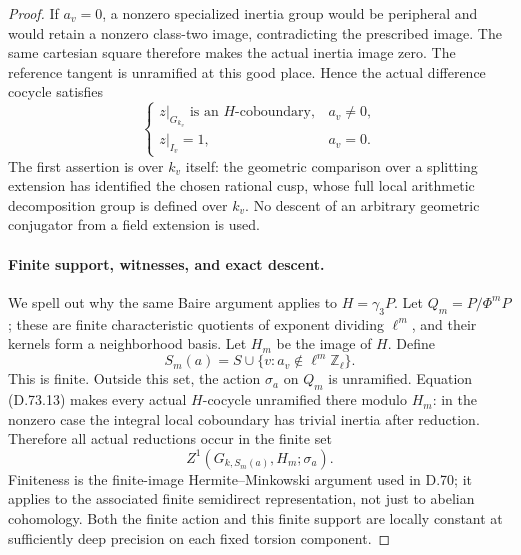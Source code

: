 \begin{proof}
If \(a_v=0\), a nonzero specialized
inertia group would be peripheral
and would retain a nonzero
class-two image, contradicting
the prescribed image. The same
cartesian square therefore makes
the actual inertia image zero.
The reference tangent is unramified
at this good place. Hence the
actual difference cocycle satisfies
\[
 \begin{cases}
 z|_{G_{k_v}}\text{ is an }H\text{-coboundary},
                                             &a_v\ne0,\\
 z|_{I_v}=1,                                &a_v=0.
 \end{cases}                                             \tag{D.73.13}
\]
The first assertion is over \(k_v\)
itself: the geometric comparison
over a splitting extension has
identified the chosen rational
cusp, whose full local arithmetic
decomposition group is defined
over \(k_v\). No descent of an
arbitrary geometric conjugator
from a field extension is used.

\paragraph{Finite support, witnesses, and exact descent.}
We spell out why the same Baire
argument applies to \(H=\gamma_3P\).
Let \(Q_m=P/\Phi^mP\); these are
finite characteristic quotients
of exponent dividing \(\ell^m\),
and their kernels form a
neighborhood basis. Let \(H_m\)
be the image of \(H\). Define
\[
         S_m(a)=S\cup\{v:a_v\notin\ell^m\mathbb Z_\ell\}.
                                                        \tag{D.73.14}
\]
This is finite. Outside this set,
the action \(\sigma_a\) on \(Q_m\)
is unramified. Equation (D.73.13)
makes every actual \(H\)-cocycle
unramified there modulo \(H_m\):
in the nonzero case the integral
local coboundary has trivial
inertia after reduction. Therefore
all actual reductions occur in
the finite set
\[
             Z^1(G_{k,S_m(a)},H_m;\sigma_a).            \tag{D.73.15}
\]
Finiteness is the finite-image
Hermite--Minkowski argument used
in D.70; it applies to the
associated finite semidirect
representation, not just to
abelian cohomology. Both the
finite action and this finite
support are locally constant
at sufficiently deep precision
on each fixed torsion component.


\end{proof}
